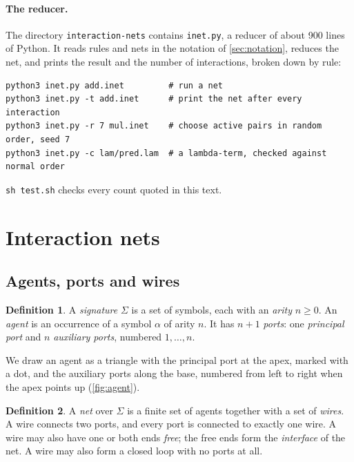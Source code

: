 \documentclass[11pt,a4paper]{article}
\theoremstyle{definition}
\newtheorem{definition}{Definition}
\theoremstyle{plain}
\begin{document}
\paragraph{The reducer.} The directory \texttt{interaction-nets} contains
\texttt{inet.py}, a reducer of about 900 lines of Python. It reads rules and
nets in the notation of \cref{sec:notation}, reduces the net, and prints the
result and the number of interactions, broken down by rule:
\begin{lstlisting}[style=plain]
python3 inet.py add.inet         # run a net
python3 inet.py -t add.inet      # print the net after every interaction
python3 inet.py -r 7 mul.inet    # choose active pairs in random order, seed 7
python3 inet.py -c lam/pred.lam  # a lambda-term, checked against normal order
\end{lstlisting}
\texttt{sh test.sh} checks every count quoted in this text.

\section{Interaction nets}\label{sec:nets}

\subsection{Agents, ports and wires}

\begin{definition}
A \emph{signature} $\Sigma$ is a set of symbols, each with an \emph{arity}
$n \ge 0$. An \emph{agent} is an occurrence of a symbol $\alpha$ of arity $n$.
It has $n+1$ \emph{ports}: one \emph{principal port} and $n$ \emph{auxiliary
ports}, numbered $1,\dots,n$.
\end{definition}

\noindent
We draw an agent as a triangle with the principal port at the apex, marked
with a dot, and the auxiliary ports along the base, numbered from left to
right when the apex points up (\cref{fig:agent}).

\begin{definition}
A \emph{net} over $\Sigma$ is a finite set of agents together with a set of
\emph{wires}. A wire connects two ports, and every port is connected to
exactly one wire. A wire may also have one or both ends \emph{free}; the free
ends form the \emph{interface} of the net. A wire may also form a closed loop
with no ports at all.
\end{definition}
\end{document}
